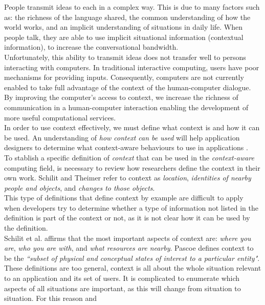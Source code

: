 People transmit ideas to each in a complex way. This
is due to many factors such as: the richness of the language shared, the common
understanding of how the world works, and an implicit understanding of
situations in daily life. When people talk, they are able to use implicit
situational information (contextual information), to increase the
conversational bandwidth. \\ Unfortunately, this ability to transmit
ideas does not transfer well to persons interacting with computers. In
traditional interactive computing, users have poor mechanisms for
providing inputs. Consequently, computers are not
currently enabled to take full advantage of the context of the 
human-computer dialogue. By improving the computer's access to context, 
we increase the richness of communication in a human-computer interaction
enabling the development of more useful computational 
services.\\
In order to use context effectively, we must define what context
is and how it can be used. An understanding of \textit{how context can
be used} will help application designers to determine what 
context-aware behaviours to use in applications \cite{dey2001understanding}.\\
To stablish a specific definition of \textit{context} that can be used
in the \textit{context-aware} computing field, is necessary to review
how researchers define the context in their own work. Schilit and
Theimer  \cite{abowd1999towards} refer to context as \textit{location},
\textit{identities of nearby people and objects}, and \textit{changes
to those objects}.\\
This type of definitions that define context by example
are difficult to apply when developers try to determine whether a type of
information not listed in the definition is part of the context or not, 
as it is not clear how it can be used by the definition.\\ 
Schilit et al.  \cite{schilit1994context} affirms that the most important
aspects of context are: \textit{where you are}, \textit{who you are
with}, and \textit{what resources are nearby}.
Pascoe \cite{pascoe1998adding} defines context to be the
\textit{``subset of physical and  conceptual states of interest to a
particular entity"}.\\
These definitions are too general, context is all about the
whole situation relevant to an application and its set of users. It is
complicated to enumerate which aspects of all situations are important,
as this will change from situation to situation. For this reason and
